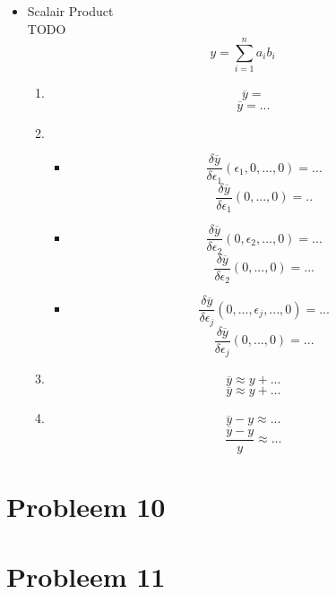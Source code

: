 \documentclass[12pt,a4paper]{article}
\begin{document}
\begin{itemize}
\item Scalair Product\\
TODO
\[
y = \sum_{i=1}^{n}a_{i}b_{i}
\]
\begin{enumerate}
\item
\[
\overline{y} = 
\]
\[
\overline{y} = ...
\]
\item
\begin{itemize}
\item
\[
\frac{\delta\overline{y}}{\delta\epsilon_1}(\epsilon_1,0,...,0)
= ...
\]
\[
\frac{\delta\overline{y}}{\delta\epsilon_1}(0,...,0)
= ..
\]
\item
\[
\frac{\delta\overline{y}}{\delta\epsilon_2}(0,\epsilon_2,...,0)
= ...
\]
\[
\frac{\delta\overline{y}}{\delta\epsilon_2}(0,...,0)
= ...
\]
\item
\[
\frac{\delta\overline{y}}{\delta\epsilon_j}(0,...,\epsilon_j,...,0)
= ...
\]
\[
\frac{\delta\overline{y}}{\delta\epsilon_j}(0,...,0)
= ...
\]
\end{itemize}

\item
\[
\overline{y} \approx y
+ ...
\]
\[
\overline{y} \approx y
+ ...
\]

\item
\[
\overline{y} - y
\approx
...
\]
\[
\frac{\overline{y} - y}{y}
\approx
...
\]
\end{enumerate}
\end{itemize}


\section{Probleem 10}
\section{Probleem 11}
\end{document}
